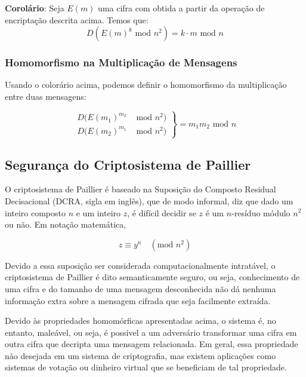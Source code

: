 \documentclass[10pt]{article}
\begin{document}
                \begin{description}
                    \item{\textbf{Corolário}}: Seja $E(m)$ uma cifra com obtida a partir da operação de encriptação descrita acima. Temos que:
                    \[
                    D(E(m)^k \text{ mod } n^2) = k \cdot m \text{ mod } n
                    \]
                \end{description}

            \subsubsection{Homomorfismo na Multiplicação de Mensagens}
                Usando o colorário acima, podemos definir o homomorfismo da multiplicação entre duas mensagens:

                \[
                \left.\begin{aligned}
                    D(E(m_1)^{m_2} & \text{ mod } n^2) \\
                    D(E(m_2)^{m_1} & \text{ mod } n^2)
                    \end{aligned}
                \right\} = m_1 m_2 \text{ mod } n
                \]

        \subsection{Segurança do Criptosistema de Paillier}
            O criptosistema de Paillier é baseado na Suposição do Composto Residual Decisacional (DCRA, sigla em inglês), que de modo informal, diz que dado um inteiro composto $n$ e um inteiro $z$, é difícil decidir se $z$ é um $n$-resíduo módulo $n^2$ ou não. Em notação matemática,

            \[
            z \equiv y^n \quad (\text{mod } n^2)
            \]

            Devido a essa suposição ser considerada computacionalmente intratável, o criptosistema de Paillier é dito semanticamente seguro, ou seja, conhecimento de uma cifra e do tamanho de uma mensagem desconhecida não dá nenhuma informação extra sobre a mensagem cifrada que seja facilmente extraída. 

            Devido às propriedades homomórficas apresentadas acima, o sistema é, no entanto, maleável, ou seja, é possível a um adversário transformar uma cifra em outra cifra que decripta uma mensagem relacionada. Em geral, essa propriedade não desejada em um sistema de criptografia, mas existem aplicações como sistemas de votação ou dinheiro virtual que se beneficiam de tal propriedade.
\end{document}
